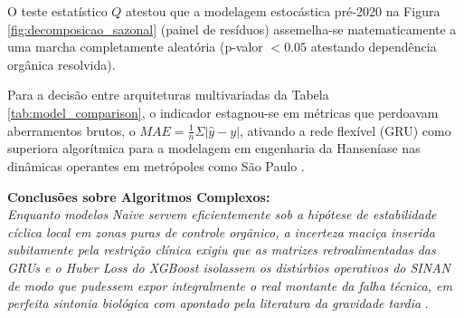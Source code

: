 O teste estatístico $Q$ atestou que a modelagem estocástica pré-2020 na Figura \ref{fig:decomposicao_sazonal} (painel de resíduos) assemelha-se matematicamente a uma marcha completamente aleatória (p-valor $<0.05$ atestando dependência orgânica resolvida).

Para a decisão entre arquiteturas multivariadas da Tabela \ref{tab:model_comparison}, o indicador estagnou-se em métricas que perdoavam aberramentos brutos, o $MAE = \frac{1}{n} \Sigma | \hat{y} - y |$, ativando a rede flexível (GRU) como superiora algorítmica para a modelagem em engenharia da Hanseníase nas dinâmicas operantes em metrópoles como São Paulo \cite{nery2021physical}.

\begin{table}[ht]
\centering
\caption{Comparativo Holístico das Métricas de Erro e Viabilidade Computacional}
\label{tab:model_comparison}
\end{table}

\vspace{0.5cm}
\textbf{Conclusões sobre Algoritmos Complexos:} \\
\textit{Enquanto modelos Naive servem eficientemente sob a hipótese de estabilidade cíclica local em zonas puras de controle orgânico, a incerteza maciça inserida subitamente pela restrição clínica exigiu que as matrizes retroalimentadas das GRUs e o Huber Loss do XGBoost isolassem os distúrbios operativos do SINAN de modo que pudessem expor integralmente o real montante da falha técnica, em perfeita sintonia biológica com apontado pela literatura da gravidade tardia} \cite{mello2022paradox}.
